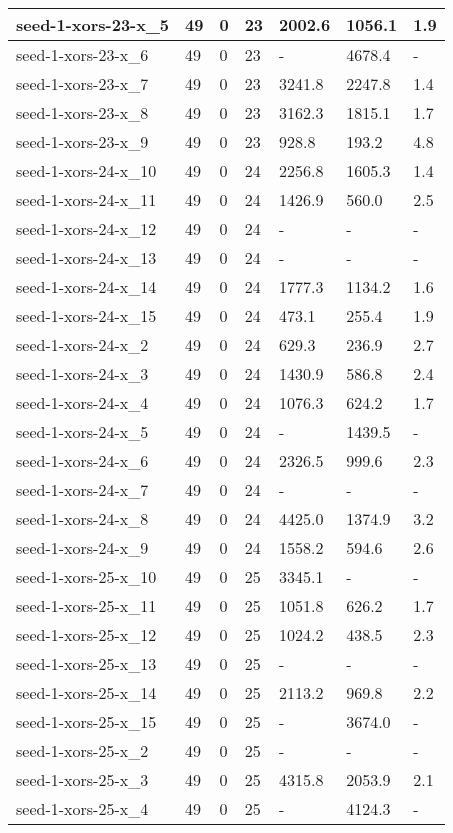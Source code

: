 \begin{scriptsize}
\begin{longtable}{|p{5cm}|l|l|l|l|l|l|}
seed-1-xors-23-x\_5&49&0&23&2002.6&1056.1&1.9 \\ \hline 
seed-1-xors-23-x\_6&49&0&23&-&4678.4&- \\ \hline 
seed-1-xors-23-x\_7&49&0&23&3241.8&2247.8&1.4 \\ \hline 
seed-1-xors-23-x\_8&49&0&23&3162.3&1815.1&1.7 \\ \hline 
seed-1-xors-23-x\_9&49&0&23&928.8&193.2&4.8 \\ \hline 
seed-1-xors-24-x\_10&49&0&24&2256.8&1605.3&1.4 \\ \hline 
seed-1-xors-24-x\_11&49&0&24&1426.9&560.0&2.5 \\ \hline 
seed-1-xors-24-x\_12&49&0&24&-&-&- \\ \hline 
seed-1-xors-24-x\_13&49&0&24&-&-&- \\ \hline 
seed-1-xors-24-x\_14&49&0&24&1777.3&1134.2&1.6 \\ \hline 
seed-1-xors-24-x\_15&49&0&24&473.1&255.4&1.9 \\ \hline 
seed-1-xors-24-x\_2&49&0&24&629.3&236.9&2.7 \\ \hline 
seed-1-xors-24-x\_3&49&0&24&1430.9&586.8&2.4 \\ \hline 
seed-1-xors-24-x\_4&49&0&24&1076.3&624.2&1.7 \\ \hline 
seed-1-xors-24-x\_5&49&0&24&-&1439.5&- \\ \hline 
seed-1-xors-24-x\_6&49&0&24&2326.5&999.6&2.3 \\ \hline 
seed-1-xors-24-x\_7&49&0&24&-&-&- \\ \hline 
seed-1-xors-24-x\_8&49&0&24&4425.0&1374.9&3.2 \\ \hline 
seed-1-xors-24-x\_9&49&0&24&1558.2&594.6&2.6 \\ \hline 
seed-1-xors-25-x\_10&49&0&25&3345.1&-&- \\ \hline 
seed-1-xors-25-x\_11&49&0&25&1051.8&626.2&1.7 \\ \hline 
seed-1-xors-25-x\_12&49&0&25&1024.2&438.5&2.3 \\ \hline 
seed-1-xors-25-x\_13&49&0&25&-&-&- \\ \hline 
seed-1-xors-25-x\_14&49&0&25&2113.2&969.8&2.2 \\ \hline 
seed-1-xors-25-x\_15&49&0&25&-&3674.0&- \\ \hline 
seed-1-xors-25-x\_2&49&0&25&-&-&- \\ \hline 
seed-1-xors-25-x\_3&49&0&25&4315.8&2053.9&2.1 \\ \hline 
seed-1-xors-25-x\_4&49&0&25&-&4124.3&- \\ \hline 

\end{longtable}
\end{scriptsize}
